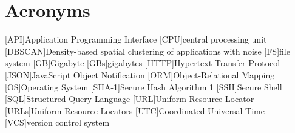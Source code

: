 \chapter*{Acronyms}
\begin{acronym}
    [API]{Application Programming Interface}
    [CPU]{central processing unit}
    [DBSCAN]{Density-based spatial clustering of applications with noise}
    [FS]{file system}
    [GB]{Gigabyte}
    [GBs]{gigabytes}
    [HTTP]{Hypertext Transfer Protocol}
    [JSON]{JavaScript Object Notification}
    [ORM]{Object-Relational Mapping}
    [OS]{Operating System}
    [SHA-1]{Secure Hash Algorithm 1}
    [SSH]{Secure Shell}
    [SQL]{Structured Query Language}
    [URL]{Uniform Resource Locator}
    [URLs]{Uniform Resource Locators}
    [UTC]{Coordinated Universal Time}
    [VCS]{version control system}
\end{acronym}
